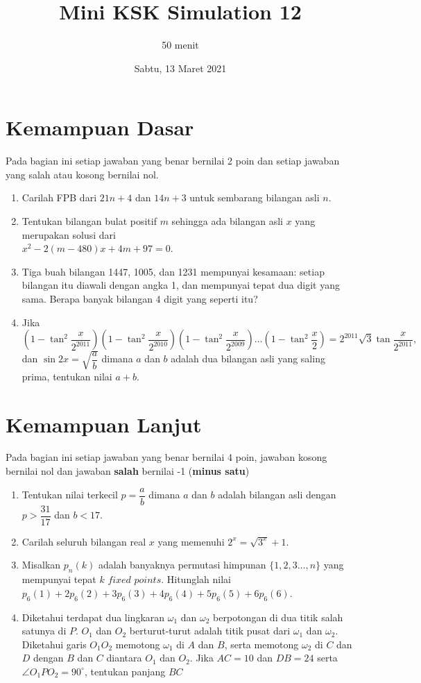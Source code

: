 \documentclass{article}
\title{Mini KSK Simulation 12}
\author{50 menit}
\date{Sabtu, 13 Maret 2021}
\begin{document}
	\maketitle
	
	\section{Kemampuan Dasar}
	Pada bagian ini setiap jawaban yang benar bernilai 2 poin dan setiap jawaban yang salah
	atau kosong bernilai nol.
	\begin{enumerate}
		\item 
		Carilah FPB dari $21n + 4$ dan $14n + 3$ untuk sembarang bilangan asli $n$.
	
		
		\item Tentukan bilangan bulat positif $m$ sehingga ada bilangan asli $x$ yang merupakan solusi dari\\ $x^2-2(m-480)x+4m+97=0$.
		
		\item Tiga buah bilangan 1447, 1005, dan 1231 mempunyai kesamaan: setiap bilangan itu diawali dengan angka 1, dan mempunyai tepat dua digit yang sama. Berapa banyak bilangan 4 digit yang seperti itu?
		
		\item Jika $$\left(1-\tan^2\frac{x}{2^{2011}}\right)\left(1-\tan^2\frac{x}{2^{2010}}\right)\left(1-\tan^2\frac{x}{2^{2009}}\right)\dots\left(1-\tan^2\frac{x}{2}\right) = 2^{2011}\sqrt{3}\tan \frac{x}{2^{2011}},$$ dan $\sin 2x = \sqrt{\dfrac{a}{b}}$ dimana $a$ dan $b$ adalah dua bilangan asli yang saling prima, tentukan nilai $a+b$.
	\end{enumerate}

\section{Kemampuan Lanjut}
Pada bagian ini setiap jawaban yang benar bernilai 4 poin, jawaban kosong bernilai nol
dan jawaban \textbf{salah} bernilai -1 (\textbf{minus satu})

\begin{enumerate}[resume]
		\item Tentukan nilai terkecil $p = \dfrac{a}{b}$ dimana $a$ dan $b$ adalah bilangan asli dengan $p > \dfrac{31}{17}$ dan $b<17$.
	\item Carilah seluruh bilangan real $x$ yang memenuhi $2^x = \sqrt{3^x}+1$.
	
	\item Misalkan $p_n(k)$ adalah banyaknya permutasi himpunan $\{1,2,3\dots,n\}$ yang mempunyai tepat $k$ $\textit{fixed points}$. Hitunglah nilai $p_6(1)+2p_6(2)+3p_6(3)+4p_6(4)+5p_6(5)+6p_6(6)$.
	
	\item Diketahui terdapat dua lingkaran $\omega_1$ dan $\omega_2$ berpotongan di dua titik salah satunya di $P$. $O_1$ dan $O_2$ berturut-turut adalah titik pusat dari $\omega_1$ dan $\omega_2$. Diketahui garis $O_1O_2$ memotong $\omega_1$ di $A$ dan $B$, serta memotong $\omega_2$ di $C$ dan $D$ dengan $B$ dan $C$ diantara $O_1$ dan $O_2$. Jika $AC=10$ dan $DB=24$ serta $\angle O_1PO_2 = 90^\circ$, tentukan panjang $BC$
	
\end{enumerate}
\end{document}
